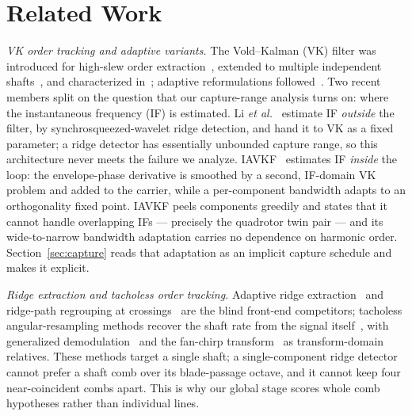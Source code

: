 \documentclass[journal]{IEEEtran}
\begin{document}
\section{Related Work}
\label{sec:related}

\emph{VK order tracking and adaptive variants.} The Vold--Kalman (VK)
filter was introduced for high-slew order
extraction~\cite{vold1993high}, extended to multiple independent
shafts~\cite{vold1997multi}, and characterized
in~\cite{herlufsen1999characteristics,tuma2000characteristics}; adaptive
reformulations followed~\cite{pan2007adaptive,pan2010extended}. Two
recent members split on the question that our capture-range analysis
turns on: where the instantaneous frequency (IF) is estimated. Li
\emph{et al.}~\cite{li2020vkswt} estimate IF \emph{outside} the filter,
by synchrosqueezed-wavelet ridge detection, and hand it to VK as a fixed
parameter; a ridge detector has essentially unbounded capture range, so
this architecture never meets the failure we analyze.
IAVKF~\cite{jiang2024iavkf} estimates IF \emph{inside} the loop: the
envelope-phase derivative is smoothed by a second, IF-domain VK problem
and added to the carrier, while a per-component bandwidth adapts to an
orthogonality fixed point. IAVKF peels components greedily and states
that it cannot handle overlapping IFs --- precisely the quadrotor twin
pair --- and its wide-to-narrow bandwidth adaptation carries no
dependence on harmonic order. Section~\ref{sec:capture} reads that
adaptation as an implicit capture schedule and makes it explicit.

\emph{Ridge extraction and tacholess order tracking.} Adaptive ridge
extraction~\cite{iatsenko2016ridges,aare2023ridge} and ridge-path
regrouping at crossings~\cite{chen2017rprg} are the blind front-end
competitors; tacholess angular-resampling methods recover the shaft rate
from the signal itself~\cite{peeters2019tacholess,wang2019tlot}, with
generalized demodulation~\cite{olhede2005generalized} and the fan-chirp
transform~\cite{weruaga2007fanchirp} as transform-domain relatives.
These methods target a single shaft; a single-component ridge detector
cannot prefer a shaft comb over its blade-passage octave, and it cannot
keep four near-coincident combs apart. This is why our global stage
scores whole comb hypotheses rather than individual lines.
\end{document}
